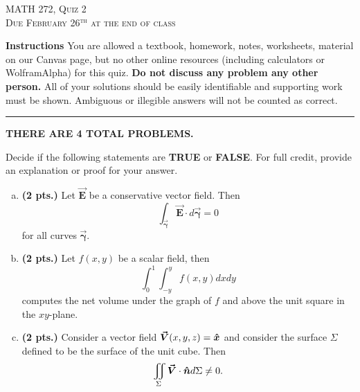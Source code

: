 \documentclass[12pt]{amsbook}
\newcommand{\vecfieldE}{\boldsymbol{\vec{E}}}
\newcommand{\vecfieldV}{\boldsymbol{\vec{V}}}
\newcommand{\curvegamma}{\boldsymbol{\vec{\gamma}}}
\begin{document}

\begin{center}
   \textsc{\large MATH 272, Quiz 2}\\
   \textsc{Due February 26$^\textrm{th}$ at the end of class}
\end{center}

\vspace{1cm}

\noindent\textbf{Instructions} \; You are allowed a textbook, homework, notes, worksheets, material on our Canvas page, but no other online resources (including calculators or WolframAlpha) for this quiz.  \textbf{Do not discuss any problem any other person.} All of your solutions should be easily identifiable and supporting work must be shown.  Ambiguous or illegible answers will not be counted as correct.


\vspace*{.5cm}
\hrule
\vspace*{.5cm}

\begin{center}\textbf{\large THERE ARE 4 TOTAL PROBLEMS.}\normalsize \end{center}

\begin{problem} 
Decide if the following statements are \textbf{TRUE} or \textbf{FALSE}. For full credit, provide an explanation or proof for your answer.
\begin{enumerate}[(a)]
    \item \textbf{(2 pts.)} Let $\vecfieldE$ be a conservative vector field. Then
    \[
    \int_{\curvegamma} \vecfieldE \cdot d \curvegamma = 0
    \]
    for all curves $\curvegamma$.
    
    \item \textbf{(2 pts.)} Let $f(x,y)$ be a scalar field, then 
    \[
        \int_{0}^1 \int_{-y}^{y} f(x,y) dxdy
    \]
    computes the net volume under the graph of $f$ and above the unit square in the $xy$-plane.

    \item \textbf{(2 pts.)} Consider a vector field $\vecfieldV(x,y,z) = \xhat$ and consider the surface $\Sigma$ defined to be the surface of the unit cube. Then
    \[
        \iint_{\Sigma} \vecfieldV \cdot \unitvec d\Sigma \neq 0.
    \]
\end{enumerate}
\end{problem}
\end{document}
